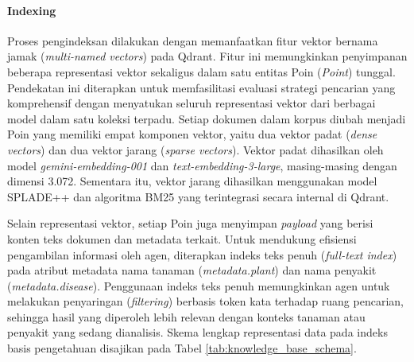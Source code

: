 \begin{table}[H]
    \centering
    \caption{Jenis Pertanyaan pada Dataset Evaluasi QA Sintetis}
    \label{tab:qa_types}
    \small
\end{table}

\paragraph{Indexing}
Proses pengindeksan dilakukan dengan memanfaatkan fitur vektor bernama jamak (\textit{multi-named vectors}) pada Qdrant. Fitur ini memungkinkan penyimpanan beberapa representasi vektor sekaligus dalam satu entitas Poin (\textit{Point}) tunggal. Pendekatan ini diterapkan untuk memfasilitasi evaluasi strategi pencarian yang komprehensif dengan menyatukan seluruh representasi vektor dari berbagai model dalam satu koleksi terpadu. Setiap dokumen dalam korpus diubah menjadi Poin yang memiliki empat komponen vektor, yaitu dua vektor padat (\textit{dense vectors}) dan dua vektor jarang (\textit{sparse vectors}). Vektor padat dihasilkan oleh model \textit{gemini-embedding-001} dan \textit{text-embedding-3-large}, masing-masing dengan dimensi 3.072. Sementara itu, vektor jarang dihasilkan menggunakan model SPLADE++ dan algoritma BM25 yang terintegrasi secara internal di Qdrant.

Selain representasi vektor, setiap Poin juga menyimpan \textit{payload} yang berisi konten teks dokumen dan metadata terkait. Untuk mendukung efisiensi pengambilan informasi oleh agen, diterapkan indeks teks penuh (\textit{full-text index}) pada atribut metadata nama tanaman (\textit{metadata.plant}) dan nama penyakit (\textit{metadata.disease}). Penggunaan indeks teks penuh memungkinkan agen untuk melakukan penyaringan (\textit{filtering}) berbasis token kata terhadap ruang pencarian, sehingga hasil yang diperoleh lebih relevan dengan konteks tanaman atau penyakit yang sedang dianalisis. Skema lengkap representasi data pada indeks basis pengetahuan disajikan pada Tabel \ref{tab:knowledge_base_schema}.

